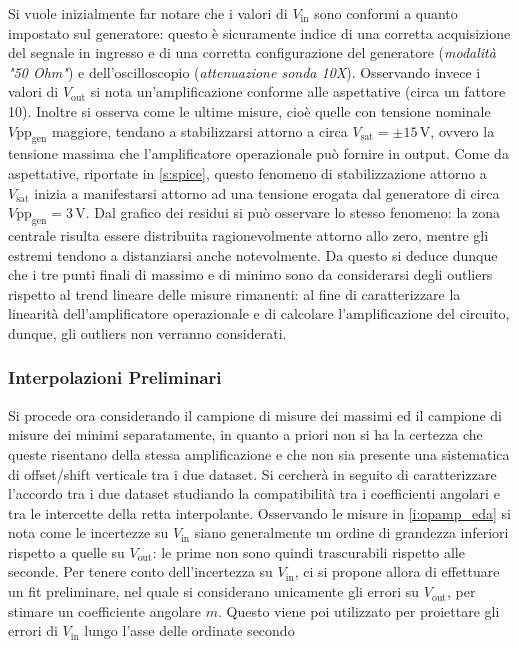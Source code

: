 \documentclass[a4paper,11pt]{article} %
\begin{document}
\noindent  Si vuole inizialmente far notare che i valori di $V_{\text{in}}$ sono conformi a quanto impostato sul
generatore: questo è sicuramente indice di una corretta acquisizione del segnale in ingresso e di una corretta
configurazione del generatore (\textit{modalità "50 Ohm"}) e dell'oscilloscopio (\textit{attenuazione sonda 10X}).
Osservando invece i valori di $V_{\text{out}}$ si nota un'amplificazione conforme alle aspettative (circa un fattore
10). Inoltre si osserva come le ultime misure, cioè quelle con tensione nominale $V\text{pp}_{\text{gen}}$ maggiore,
tendano a stabilizzarsi attorno a circa $V_{\text{sat}}=\pm15\,\si{\volt}$, ovvero la tensione massima che
l'amplificatore operazionale può fornire in output. Come da aspettative, riportate in \autoref{s:spice}, questo fenomeno
di stabilizzazione attorno a $V_{\text{sat}}$ inizia a manifestarsi attorno ad una tensione erogata dal generatore di
circa $V\text{pp}_{\text{gen}}=3\,\si{\volt}$. Dal grafico dei residui si può osservare lo stesso fenomeno: la zona
centrale risulta essere distribuita ragionevolmente attorno allo zero, mentre gli estremi tendono a distanziarsi anche
notevolmente. Da questo si deduce dunque che i tre punti finali di massimo e di minimo sono da considerarsi degli
outliers rispetto al trend lineare delle misure rimanenti: al fine di caratterizzare la linearità dell'amplificatore
operazionale e di calcolare l'amplificazione del circuito, dunque, gli outliers non verranno considerati.


\subsubsection{Interpolazioni Preliminari}\label{s:pre} Si procede ora considerando il campione di misure dei massimi ed
il campione di misure dei minimi separatamente, in quanto a priori non si ha la certezza che queste risentano della
stessa amplificazione e che non sia presente una sistematica di offset/shift verticale tra i due dataset. Si cercherà in
seguito di caratterizzare l'accordo tra i due dataset studiando la compatibilità tra i coefficienti angolari e tra le
intercette della retta interpolante. Osservando le misure in  \autoref{i:opamp_eda} si nota come le incertezze su
$V_{\text{in}}$ siano generalmente un ordine di grandezza inferiori rispetto a quelle su $V_{\text{out}}$: le prime non
sono quindi trascurabili rispetto alle seconde. Per tenere conto dell'incertezza su $V_{\text{in}}$, ci si propone
allora di effettuare un fit preliminare, nel quale si considerano unicamente gli errori su $V_{\text{out}}$, per stimare
un coefficiente angolare $m$. Questo viene poi utilizzato per proiettare gli errori di $V_{\text{in}}$ lungo l'asse
delle ordinate secondo 
\end{document}

